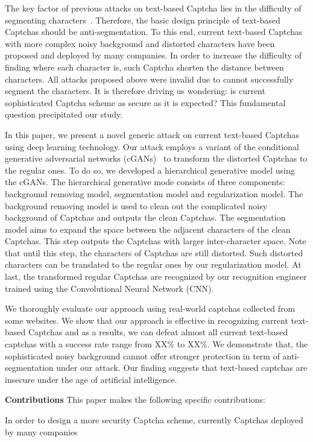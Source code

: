 The key factor of previous attacks on text-based Captcha lies in the difficulty of segmenting characters~\cite{Chellapilla2005Computers}. Therefore, the basic design principle of text-based Captchas should be anti-segmentation. To this end, current text-based Captchas with more complex noisy background and distorted characters have been proposed and deployed by many companies. In order to increase the difficulty of finding where each character is, such Captcha shorten the distance between characters. All attacks proposed above were invalid due to cannot successfully segment the characters. It is therefore driving us wondering: is current sophisticated Captcha scheme as secure as it is expected? This fundamental question precipitated our study.

In this paper, we present a novel generic attack on current text-based Captchas using deep learning technology. Our attack employs a variant of the conditional generative adversarial networks (cGANs)~\cite{pix2pix2016} to transform the distorted Captchas to the regular ones.
To do so, we developed a hierarchical generative model using the cGANs. The hierarchical generative mode consists of three components: background removing model, segmentation model and regularization model.
The background removing model is used to clean out the complicated noisy background of Captchas and outputs the clean Captchas. The segmentation model aims to expand the space between the adjacent characters of the clean Captchas. This step outputs the Captchas with larger inter-character space. Note that until this step, the characters of Captchas are still distorted. Such distorted characters can be translated to the regular ones by our regularization model.
At last, the transformed regular Captchas are recognized by our recognition engineer trained using the Convolutional Neural Network (CNN).

We thoroughly evaluate our approach using real-world captchas collected from some websites. We show that our approach is effective in recognizing current text-based Captchas and as a results, we can defeat almost all current text-based captchas with a success rate range from XX\% to XX\%. We demonstrate that, the sophisticated noisy background cannot offer stronger protection in term of anti-segmentation under our attack. Our finding suggests that text-based captchas are insecure under the age of artificial intelligence.


\textbf{Contributions} This paper makes the following specific contributions:

In order to design a more security Captcha scheme, currently Captchas deployed by many companies 